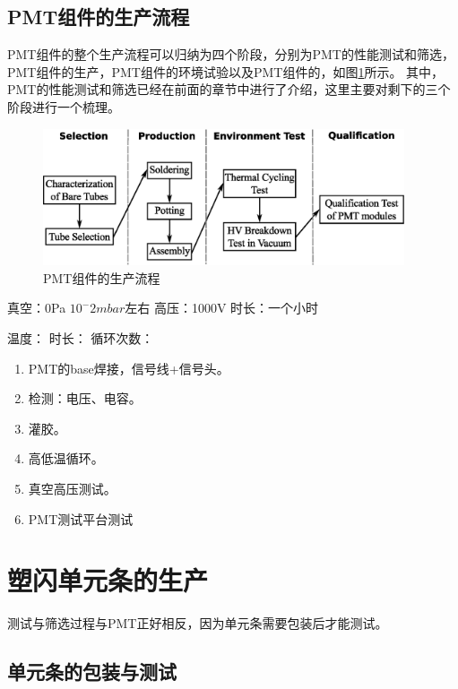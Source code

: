 \subsection{PMT组件的生产流程}
\label{sec:construction:pmt_procedure}
PMT组件的整个生产流程可以归纳为四个阶段，分别为PMT的性能测试和筛选，PMT组件的生产，PMT组件的环境试验以及PMT组件的，如图\ref{fig:construction:pmt_production_procedure}所示。
其中，PMT的性能测试和筛选已经在前面的章节中进行了介绍，这里主要对剩下的三个阶段进行一个梳理。
\begin{figure}[htbp]
	\centering
	\includegraphics[width=0.95\textwidth]{chap/construction/fig/pmt_production_procedure.eps}
	\caption{PMT组件的生产流程}
	\label{fig:construction:pmt_production_procedure}
\end{figure}
 

真空：0Pa $10^-2mbar$左右
高压：1000V
时长：一个小时

温度：
时长：
循环次数：

 
\begin{enumerate}
	\item PMT的base焊接，信号线+信号头。
	\item 检测：电压、电容。
	\item 灌胶。
	\item 高低温循环。
	\item 真空高压测试。
	\item PMT测试平台测试
\end{enumerate}

\section{塑闪单元条的生产}
\label{sec:construction:bar_production}
测试与筛选过程与PMT正好相反，因为单元条需要包装后才能测试。

\subsection{单元条的包装与测试}
\label{sec:construction:bar_wrapping_and_test}

